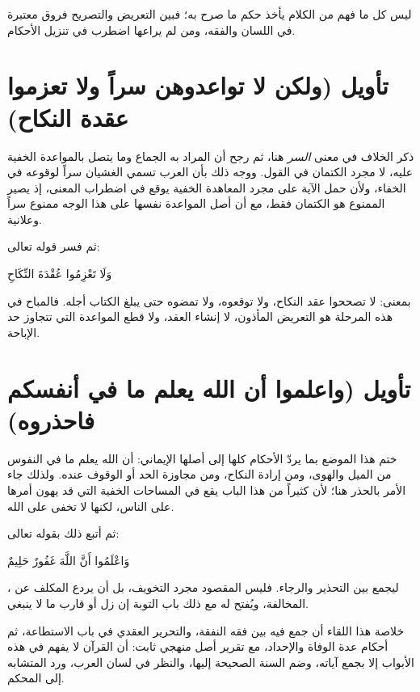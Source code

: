 \begin{fawaid}
ليس كل ما فهم من الكلام يأخذ حكم ما صرح به؛ فبين التعريض والتصريح فروق معتبرة في اللسان والفقه، ومن لم يراعها اضطرب في تنزيل الأحكام.
\end{fawaid}

\section{تأويل (ولكن لا تواعدوهن سراً ولا تعزموا عقدة النكاح)}
ذكر  الخلاف في معنى \textit{السر} هنا، ثم رجح أن المراد به الجماع وما يتصل بالمواعدة الخفية عليه، لا مجرد الكتمان في القول. ووجه ذلك بأن العرب تسمي الغشيان سراً لوقوعه في الخفاء، ولأن حمل الآية على مجرد المعاهدة الخفية يوقع في اضطراب المعنى، إذ يصير الممنوع هو الكتمان فقط، مع أن أصل المواعدة نفسها على هذا الوجه ممنوع سراً وعلانية.

ثم فسر قوله تعالى: \begin{ayah}وَلَا تَعْزِمُوا عُقْدَةَ النِّكَاحِ\end{ayah} بمعنى: لا تصححوا عقد النكاح، ولا توقعوه، ولا تمضوه حتى يبلغ الكتاب أجله. فالمباح في هذه المرحلة هو التعريض المأذون، لا إنشاء العقد، ولا قطع المواعدة التي تتجاوز حد الإباحة.

\section{تأويل (واعلموا أن الله يعلم ما في أنفسكم فاحذروه)}
ختم  هذا الموضع بما يردّ الأحكام كلها إلى أصلها الإيماني: أن الله يعلم ما في النفوس من الميل والهوى، ومن إرادة النكاح، ومن مجاوزة الحد أو الوقوف عنده. ولذلك جاء الأمر بالحذر هنا؛ لأن كثيراً من هذا الباب يقع في المساحات الخفية التي قد يهون أمرها على الناس، لكنها لا تخفى على الله.

ثم أتبع ذلك بقوله تعالى: \begin{ayah}وَاعْلَمُوا أَنَّ اللَّهَ غَفُورٌ حَلِيمٌ\end{ayah}، ليجمع بين التحذير والرجاء. فليس المقصود مجرد التخويف، بل أن يردع المكلف عن المخالفة، ويُفتح له مع ذلك باب التوبة إن زل أو قارب ما لا ينبغي.

\separator

خلاصة هذا اللقاء أن  جمع فيه بين فقه النفقة، والتحرير العقدي في باب الاستطاعة، ثم أحكام عدة الوفاة والإحداد، مع تقرير أصل منهجي ثابت: أن القرآن لا يفهم في هذه الأبواب إلا بجمع آياته، وضم السنة الصحيحة إليها، والنظر في لسان العرب، ورد المتشابه إلى المحكم.
